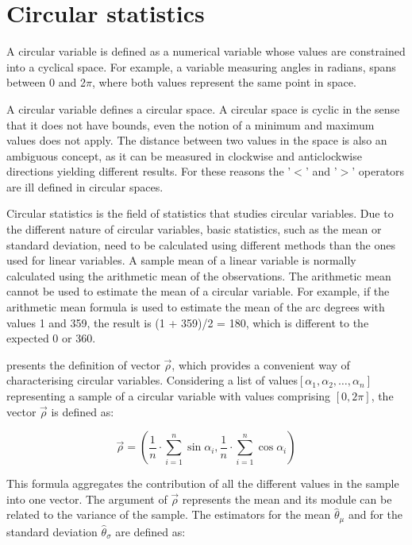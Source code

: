 \documentclass[times,twocolumn,final,authoryear]{elsarticle}
\begin{document}
\section{Circular statistics}
A circular variable is defined as a numerical variable whose values are constrained into a cyclical space. For example, a variable measuring angles in radians, spans between 0 and 2$ \pi $, where both values represent the same point in space. 

A circular variable defines a circular space. A circular space is cyclic in the sense that it does not have bounds, even the notion of a minimum and maximum values does not apply. The distance between two values in the space is also an ambiguous concept, as it can be measured in clockwise and anticlockwise directions yielding different results. For these reasons the '$<$' and '$>$' operators are ill defined in circular spaces.

Circular statistics is the field of statistics that studies circular variables. Due to the different nature of circular variables, basic statistics, such as the mean or standard deviation, need to be calculated using different methods than the ones used for linear variables. A sample mean of a linear variable is normally calculated using the arithmetic mean of the observations. The arithmetic mean cannot be used to estimate the mean of a circular variable. For example, if the arithmetic mean formula is used to estimate the mean of the arc degrees with values 1 and 359, the result is (1 + 359)/2 = 180, which is different to the expected 0 or 360.

\citep{Fisher1992} presents the definition of vector $ \vec{\rho} $, which provides a convenient way of characterising circular variables. Considering a list of values$ [\alpha_1, \alpha_2, \dots, \alpha_n] $ representing a sample of a circular variable with values comprising $ [0, 2\pi] $, the vector $ \vec{\rho} $ is defined as:

\begin{displaymath}
\vec{\rho} = \left(\frac{1}{n}\cdot\sum_{i=1}^n \sin\alpha_i, \frac{1}{n}\cdot\sum_{i=1}^n \cos\alpha_i\right)
\end{displaymath}

This formula aggregates the contribution of all the different values in the sample into one vector. The argument of $ \vec{\rho} $ represents the mean and its module can be related to the variance of the sample. The estimators for the mean $ \hat{\theta}_{\mu} $ and for the standard deviation $ \hat{\theta}_{\sigma} $ are defined as: 
\end{document}

